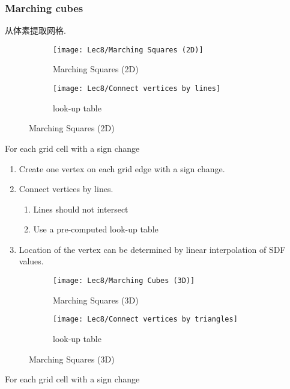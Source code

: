 \subsubsection{Marching cubes}
从体素提取网格. 

\begin{figure}[H]
    \centering
    \begin{subfigure}{0.28\textwidth}
        \centering
        \texttt{[image: Lec8/Marching Squares (2D)]}
        \caption{Marching Squares (2D)}
    \end{subfigure}
    \begin{subfigure}{0.28\textwidth}
        \centering
        \texttt{[image: Lec8/Connect vertices by lines]}
        \caption{look-up table}
    \end{subfigure}
    \caption{Marching Squares (2D)}
\end{figure}

For each grid cell with a sign change
\begin{enumerate}
    \item Create one vertex on each grid edge with a sign change.
    \item Connect vertices by lines.
    \begin{enumerate}
        \item Lines should not intersect
        \item Use a pre-computed look-up table
    \end{enumerate}
    \item Location of the vertex can be determined by linear interpolation of SDF values.
\end{enumerate}

\begin{figure}[H]
    \centering
    \begin{subfigure}{0.28\textwidth}
        \centering
        \texttt{[image: Lec8/Marching Cubes (3D)]}
        \caption{Marching Squares (3D)}
    \end{subfigure}
    \begin{subfigure}{0.28\textwidth}
        \centering
        \texttt{[image: Lec8/Connect vertices by triangles]}
        \caption{look-up table}
    \end{subfigure}
    \caption{Marching Squares (3D)}
\end{figure}

For each grid cell with a sign change


